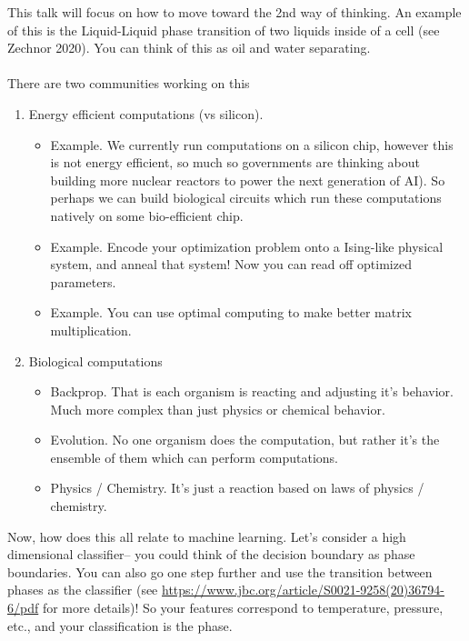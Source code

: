 This talk will focus on how to move toward the 2nd way of thinking. An example of this is the Liquid-Liquid phase transition of two liquids inside of a cell (see Zechnor 2020). You can think of this as oil and water separating.
\\
\\
There are two communities working on this
\begin{enumerate}
	\item Energy efficient computations (vs silicon). 
	\begin{itemize}
		\item Example. We currently run computations on a silicon chip, however this is not energy efficient, so much so governments are thinking about building more nuclear reactors to power the next generation of AI). So perhaps we can build biological circuits which run these computations natively on some bio-efficient chip.
		\item Example. Encode your optimization problem onto a Ising-like physical system, and anneal that system! Now you can read off optimized parameters.
		\item Example. You can use optimal computing to make better matrix multiplication.
	\end{itemize}
	\item Biological computations
	\begin{itemize}
		\item Backprop. That is each organism is reacting and adjusting it's behavior. Much more complex than just physics or chemical behavior.
		\item Evolution. No one organism does the computation, but rather it's the ensemble of them which can perform computations.
		\item Physics / Chemistry. It's just a reaction based on laws of physics / chemistry.
	\end{itemize}
\end{enumerate}
Now, how does this all relate to machine learning. Let's consider a high dimensional classifier-- you could think of the decision boundary as phase boundaries. You can also go one step further and use the transition between phases as the classifier (see \url{https://www.jbc.org/article/S0021-9258(20)36794-6/pdf} for more details)! So your features correspond to temperature, pressure, etc., and your classification is the phase. 
